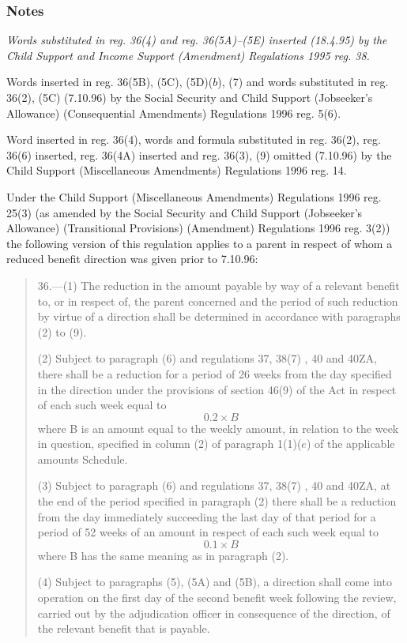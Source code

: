 \documentclass[a4paper]{article}
\newcommand\amendment[1]{\subsubsection*{Notes}{\itshape\frenchspacing\footnotesize #1 \par}}
\begin{document}
\amendment{
Words substituted in reg. 36(4) and reg. 36(5A)--(5E) inserted (18.4.95) by the Child Support and Income Support (Amendment) Regulations 1995 reg. 38.

Words inserted in reg. 36(5B), (5C), (5D)($b$), 
(7) and words substituted in reg. 36(2), %
(5C) (7.10.96) by the Social Security and Child Support (Jobseeker's Allowance) (Consequential Amendments) Regulations 1996 reg. 5(6).

Word inserted in reg. 36(4), words and formula substituted in reg. 36(2), reg. 36(6) inserted, reg. 36(4A) inserted and reg. 36(3), (9) omitted (7.10.96) by the Child Support (Miscellaneous Amendments) Regulations 1996 reg. 14.

Under the Child Support (Miscellaneous Amendments) Regulations 1996 reg. 25(3) (as amended by the Social Security and Child Support (Jobseeker's Allowance) (Transitional Provisions) (Amendment) Regulations 1996 reg. 3(2)) the following version of this regulation applies to a parent in respect of whom a reduced benefit direction was given prior to 7.10.96:

\begin{quotation}
36.—(1) The reduction in the amount payable by way of a relevant benefit to, or in respect of, the parent concerned and the period of such reduction by virtue of a direction shall be determined in accordance with paragraphs (2) to (9).

(2) Subject to paragraph (6) and regulations 37, 38(7)%
, 40 and 40ZA,  %
there shall be a reduction for a period of 
26 weeks 
from the day specified in the direction under the provisions of section 46(9) of the Act in respect of each such week equal to
\[0.2 \times B\]
where B is an amount equal to the weekly amount, in relation to the week in question, specified in column (2) of paragraph 1(1)($e$) of the applicable amounts Schedule.

(3) Subject to paragraph (6) and regulations 37, 38(7)%
, 40 and 40ZA,  %
at the end of the period specified in paragraph (2) there shall be a reduction from the day immediately succeeding the last day of that period for a period of 52 weeks of an amount in respect of each such week equal to
\[0.1 \times B\]
where B has the same meaning as in paragraph (2).

(4) 
Subject to paragraphs 
(5), (5A) and (5B),  %
a direction shall come into operation on the first day of the second benefit week following the review, carried out by the adjudication officer in consequence of the direction, of the relevant benefit that is payable.


\end{quotation}}
\end{document}
